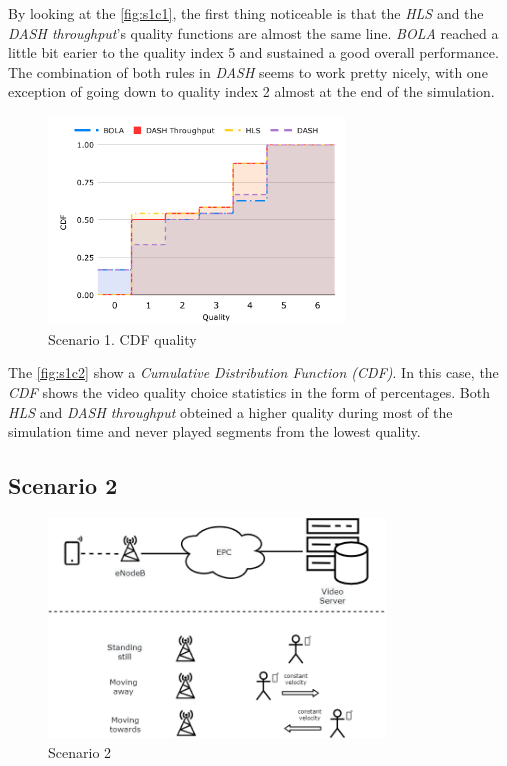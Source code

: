 By looking at the \autoref{fig:s1c1}, the first thing noticeable is that the \textit{HLS} and the \textit{DASH throughput}'s
quality functions are almost the same line. \textit{BOLA} reached a little bit earier to the quality index 5 and 
sustained a good overall performance.
The combination of both rules in \textit{DASH} seems to work pretty nicely, with one exception of going
down to quality index 2 almost at the end of the simulation. 

\begin{figure}[h]
    \centering
    \includegraphics[width=0.7\textwidth]{img/s1c2.pdf}
    \caption{Scenario 1. CDF quality}
    \label{fig:s1c2}
\end{figure}

The \autoref{fig:s1c2} show a \textit{Cumulative Distribution Function (CDF)}. In this 
case, the \textit{CDF} shows the video quality choice statistics in the form of percentages. 
Both \textit{HLS} and \textit{DASH throughput} obteined a higher quality during most of 
the simulation time and never played segments from the lowest quality.

\clearpage

\subsection{Scenario 2}

\begin{figure}[h]
    \centering
    \includegraphics[width=0.8\textwidth]{img/scenario2.png}
    \caption{Scenario 2}
    \label{fig:scenario2}
\end{figure}

